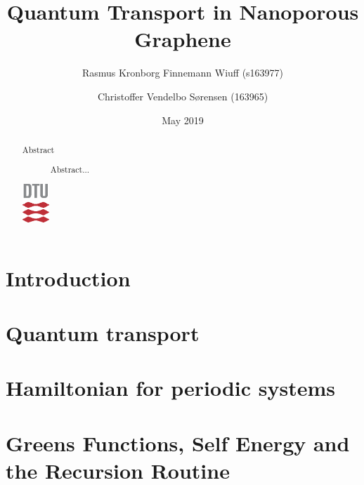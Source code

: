 \documentclass[aps, prb, a4paper, english, 12pt, onecolumn, longbibliography, amsmath, amssymb, colorinlistoftodos, floatfix, svgnames]{revtex4-2}
\numberwithin{equation}{subsection}
\begin{document}
\begin{abstract}
	\vspace{5mm}
	\centering
	\begin{description}
		\item[Abstract] Abstract... \vspace{3\baselineskip}
	\end{description}
	\includegraphics[width=1cm]{Figures/DTU3CMYK.eps}
\end{abstract}

\title{Quantum Transport in Nanoporous Graphene}
\date{May  2019}
\author{Rasmus Kronborg Finnemann Wiuff (s163977)}
\author{Christoffer Vendelbo Sørensen (163965)}
\maketitle
\newpage
{}
\twocolumngrid
\tableofcontents
\newpage
\onecolumngrid

\makeatletter
\let\toc@pre\relax
\let\toc@post\relax
\makeatother

\thispagestyle{empty}
\setcounter{page}{1}
\section{Introduction}

\section{Quantum transport}\label{theorysec}

\section{Hamiltonian for periodic systems}\label{hamilsec}

\section{Greens Functions, Self Energy and the Recursion Routine}\label{greensec}

\end{document}
